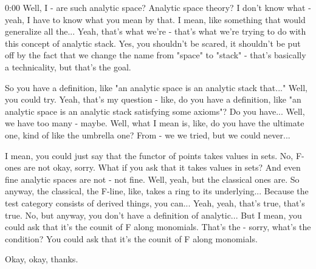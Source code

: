 \begin{unfinished}{0:00}
Well, I - are such analytic space? Analytic space theory? I don't know what - yeah, I have to know what you mean by that. I mean, like something that would generalize all the... Yeah, that's what we're - that's what we're trying to do with this concept of analytic stack. Yes, you shouldn't be scared, it shouldn't be put off by the fact that we change the name from "space" to "stack" - that's basically a technicality, but that's the goal.

So you have a definition, like "an analytic space is an analytic stack that..." Well, you could try. Yeah, that's my question - like, do you have a definition, like "an analytic space is an analytic stack satisfying some axioms"? Do you have... Well, we have too many - maybe. Well, what I mean is, like, do you have the ultimate one, kind of like the umbrella one? From - we we tried, but we could never...

I mean, you could just say that the functor of points takes values in sets. No, F-ones are not okay, sorry. What if you ask that it takes values in sets? And even fine analytic spaces are not - not fine. Well, yeah, but the classical ones are. So anyway, the classical, the F-line, like, takes a ring to its underlying... Because the test category consists of derived things, you can... Yeah, yeah, that's true, that's true. No, but anyway, you don't have a definition of analytic... But I mean, you could ask that it's the counit of F along monomials. That's the - sorry, what's the condition? You could ask that it's the counit of F along monomials.

Okay, okay, thanks.

\end{unfinished}